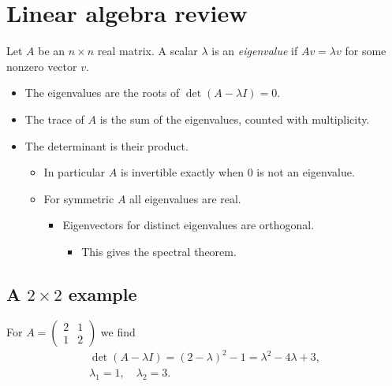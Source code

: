 \documentclass[10pt,letterpaper]{article}
\begin{document}
\section{Linear algebra review}
Let $A$ be an $n\times n$ real matrix. A scalar $\lambda$ is an \emph{eigenvalue} if $Av=\lambda v$ for some nonzero vector $v$.

\begin{itemize}
\item The eigenvalues are the roots of $\det(A-\lambda I)=0$.
\item The trace of $A$ is the sum of the eigenvalues, counted with multiplicity.
\item The determinant is their product.
  \begin{itemize}
  \item In particular $A$ is invertible exactly when $0$ is not an eigenvalue.
  \item For symmetric $A$ all eigenvalues are real.
    \begin{itemize}
    \item Eigenvectors for distinct eigenvalues are orthogonal.
      \begin{itemize}
      \item This gives the spectral theorem.
      \end{itemize}
    \end{itemize}
  \end{itemize}
\end{itemize}

\subsection{A $2\times2$ example}
For $A=\begin{pmatrix}2&1\\1&2\end{pmatrix}$ we find
\begin{gather*}
\det(A-\lambda I)=(2-\lambda)^2-1=\lambda^2-4\lambda+3,\\
\lambda_1=1,\quad\lambda_2=3.
\end{gather*}
\end{document}
